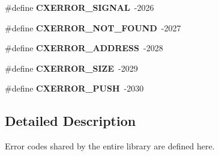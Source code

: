 \begin{DoxyCompactItemize}
\#define {\bfseries C\+X\+E\+R\+R\+O\+R\+\_\+\+S\+I\+G\+N\+AL}~-\/2026
\item 
\mbox{\label{a00008_a658279061a52324f85003fd97afb154c}} 
\#define {\bfseries C\+X\+E\+R\+R\+O\+R\+\_\+\+N\+O\+T\+\_\+\+F\+O\+U\+ND}~-\/2027
\item 
\mbox{\label{a00008_a49e8e2410fe21c65f3bc858087f514f3}} 
\#define {\bfseries C\+X\+E\+R\+R\+O\+R\+\_\+\+A\+D\+D\+R\+E\+SS}~-\/2028
\item 
\mbox{\label{a00008_a7512de878ea8479d3dd2f9c1efe35861}} 
\#define {\bfseries C\+X\+E\+R\+R\+O\+R\+\_\+\+S\+I\+ZE}~-\/2029
\item 
\mbox{\label{a00008_a5d322d3ae6c6f0308125734673619399}} 
\#define {\bfseries C\+X\+E\+R\+R\+O\+R\+\_\+\+P\+U\+SH}~-\/2030
\end{DoxyCompactItemize}


\subsection{Detailed Description}
Error codes shared by the entire library are defined here. 

